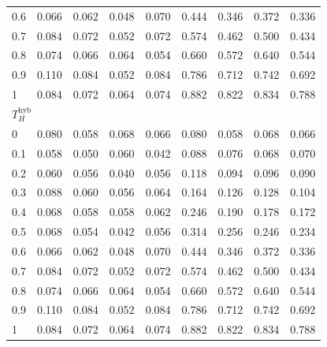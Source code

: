 \begin{table}[htbp]
\begin{tabular}{lcccccccc}
0.6 & 0.066 & 0.062 & 0.048 & 0.070 & 0.444 & 0.346 & 0.372 & 0.336 \\
0.7 & 0.084 & 0.072 & 0.052 & 0.072 & 0.574 & 0.462 & 0.500 & 0.434 \\
0.8 & 0.074 & 0.066 & 0.064 & 0.054 & 0.660 & 0.572 & 0.640 & 0.544 \\
0.9 & 0.110 & 0.084 & 0.052 & 0.084 & 0.786 & 0.712 & 0.742 & 0.692 \\
1 & 0.084 & 0.072 & 0.064 & 0.074 & 0.882 & 0.822 & 0.834 & 0.788 \\
\midrule
\multicolumn{9}{l}{\textit{$T_H^{\mathrm{hyb}}$}} \\
0 & 0.080 & 0.058 & 0.068 & 0.066 & 0.080 & 0.058 & 0.068 & 0.066 \\
0.1 & 0.058 & 0.050 & 0.060 & 0.042 & 0.088 & 0.076 & 0.068 & 0.070 \\
0.2 & 0.060 & 0.056 & 0.040 & 0.056 & 0.118 & 0.094 & 0.096 & 0.090 \\
0.3 & 0.088 & 0.060 & 0.056 & 0.064 & 0.164 & 0.126 & 0.128 & 0.104 \\
0.4 & 0.068 & 0.058 & 0.058 & 0.062 & 0.246 & 0.190 & 0.178 & 0.172 \\
0.5 & 0.068 & 0.054 & 0.042 & 0.056 & 0.314 & 0.256 & 0.246 & 0.234 \\
0.6 & 0.066 & 0.062 & 0.048 & 0.070 & 0.444 & 0.346 & 0.372 & 0.336 \\
0.7 & 0.084 & 0.072 & 0.052 & 0.072 & 0.574 & 0.462 & 0.500 & 0.434 \\
0.8 & 0.074 & 0.066 & 0.064 & 0.054 & 0.660 & 0.572 & 0.640 & 0.544 \\
0.9 & 0.110 & 0.084 & 0.052 & 0.084 & 0.786 & 0.712 & 0.742 & 0.692 \\
1 & 0.084 & 0.072 & 0.064 & 0.074 & 0.882 & 0.822 & 0.834 & 0.788 \\
\bottomrule
\end{tabular}
\par\smallskip

\end{table}
